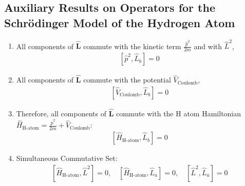 \documentclass[letterpaper,10pt,english]{jupyterBook}
\begin{document}
\subsection{Auxiliary Results on Operators for the Schrödinger Model of the Hydrogen Atom}
\label{\detokenize{ch/quantum-mechanics/atom-models/schrodinger-notes:auxiliary-results-on-operators-for-the-schrodinger-model-of-the-hydrogen-atom}}\label{\detokenize{ch/quantum-mechanics/atom-models/schrodinger-notes:quantum-mechanics-atom-models-schrodinger-notes}}\label{\detokenize{ch/quantum-mechanics/atom-models/schrodinger-notes::doc}}\begin{enumerate}
%
\item {} 
\sphinxAtStartPar
All components of \(\hat{\mathbf{L}}\) commute with the kinetic term \(\frac{\hat{p}^2}{2m}\) and with \(\hat{L}^2\), {\hyperref[\detokenize{ch/quantum-mechanics/atom-models/schrodinger-notes:quantum-mechanics-atom-models-schrodinger-notes-commutation-l-p2}]{}}
\begin{equation*}
\begin{split}[\hat{p}^2, \hat{L}_b] = 0\end{split}
\end{equation*}
\item {} 
\sphinxAtStartPar
All components of \(\hat{\mathbf{L}}\) commute with the potential \(\hat{V}_{\text{Coulomb}}\), {\hyperref[\detokenize{ch/quantum-mechanics/atom-models/schrodinger-notes:quantum-mechanics-atom-models-schrodinger-notes-commutation-l-v}]{}}
\begin{equation*}
\begin{split}[\hat{V}_{\text{Coulomb}}, \hat{L}_b] = 0\end{split}
\end{equation*}
\item {} 
\sphinxAtStartPar
Therefore, all components of \(\hat{\mathbf{L}}\) commute with the \(\text{H}\) atom Hamiltonian \(\hat{H}_{\text{H-atom}} = \frac{\hat{p}^2}{2m} + \hat{V}_{\text{Coulomb}}\):
\begin{equation*}
\begin{split}[\hat{H}_{\text{H-atom}}, \hat{L}_b] = 0\end{split}
\end{equation*}
\item {} 
\sphinxAtStartPar
Simultaneous Commutative Set:
\begin{equation*}
\begin{split}\boxed{[\hat{H}_{\text{H-atom}}, \hat{L}^2] = 0, \quad [\hat{H}_{\text{H-atom}}, \hat{L}_a] = 0, \quad [\hat{L}^2, \hat{L}_a] = 0}\end{split}

\end{equation*}
\end{enumerate}
\end{document}
